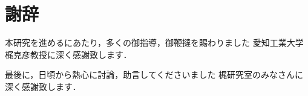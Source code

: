 \chapter*{謝辞}

本研究を進めるにあたり，多くの御指導，御鞭撻を賜わりました
愛知工業大学梶克彦教授に深く感謝致します．

最後に，日頃から熱心に討論，助言してくださいました
梶研究室のみなさんに深く感謝致します．

